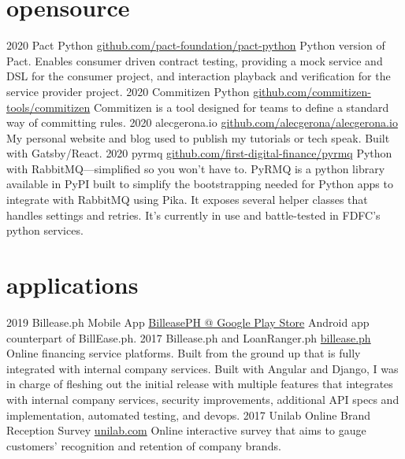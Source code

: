 \documentclass[]{friggeri-cv}
\begin{document}
\section{opensource}
\begin{entrylist}
  \entry
    {2020}
    {Pact Python}
    {\href{https://github.com/pact-foundation/pact-python}{github.com/pact-foundation/pact-python}}
    {Python version of Pact. Enables consumer driven contract testing, providing a mock service and DSL for the consumer project, and interaction playback and verification for the service provider project.}
  \entry
    {2020}
    {Commitizen Python}
    {\href{https://github.com/commitizen-tools/commitizen}{github.com/commitizen-tools/commitizen}}
    {Commitizen is a tool designed for teams to define a standard way of committing rules.}
  \entry
    {2020}
    {alecgerona.io}
    {\href{https://github.com/alecgerona/alecgerona.io}{github.com/alecgerona/alecgerona.io}}
    {My personal website and blog used to publish my tutorials or tech speak. Built with Gatsby/React.}
  \entry
    {2020}
    {pyrmq}
    {\href{https://github.com/first-digital-finance/pyrmq}{github.com/first-digital-finance/pyrmq}}
    {Python with RabbitMQ—simplified so you won't have to. PyRMQ is a python library available in PyPI built to simplify the bootstrapping needed for Python apps to integrate with RabbitMQ using Pika. It exposes several helper classes that handles settings and retries. It's currently in use and battle-tested in FDFC's python services.}
\end{entrylist}

\break
\break
\break

\section{applications}

\begin{entrylist}
  \entry
    {2019}
    {Billease.ph Mobile App}
    {\href{https://play.google.com/store/apps/details?id=ph.billeasev2.mobile}{BilleasePH @ Google Play Store}}
    {Android app counterpart of BillEase.ph. }
  \entry
    {2017}
    {Billease.ph and LoanRanger.ph}
    {\href{https://billease.ph}{billease.ph}}
    {Online financing service platforms. Built from the ground up that is fully integrated with
    internal company services. Built with Angular and Django, I was in charge of fleshing out the initial release with multiple features that integrates with internal company services, security improvements, additional API specs and implementation, automated testing, and devops.}
  \entry
    {2017}
    {Unilab Online Brand Reception Survey}
    {\href{https://www.unilab.com.ph/}{unilab.com}}
    {Online interactive survey that aims to gauge customers' recognition and retention of company brands.}
\end{entrylist}
\end{document}
